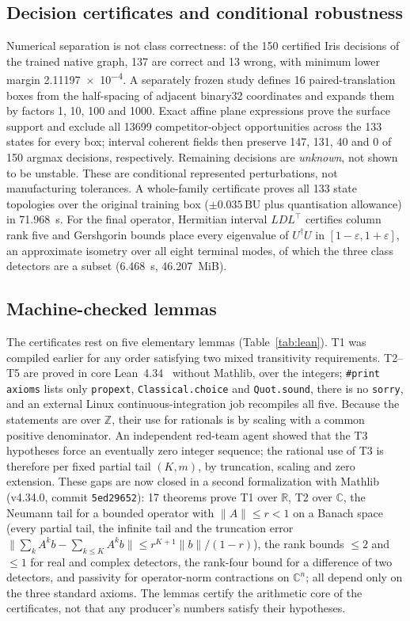 \documentclass[11pt,a4paper]{article}
\newcommand{\BU}{\,\mathrm{BU}}
\begin{document}
\subsection{Decision certificates and conditional robustness}
Numerical separation is not class correctness: of the 150 certified Iris decisions of the trained native graph, 137 are correct and 13 wrong, with minimum lower margin \num{2.11197e-4}. A separately frozen study defines 16 paired-translation boxes from the half-spacing of adjacent binary32 coordinates and expands them by factors 1, 10, 100 and 1000. Exact affine plane expressions prove the surface support and exclude all \num{13699} competitor-object opportunities across the 133 states for every box; interval coherent fields then preserve 147, 131, 40 and 0 of 150 argmax decisions, respectively. Remaining decisions are \emph{unknown}, not shown to be unstable. These are conditional represented perturbations, not manufacturing tolerances. A whole-family certificate proves all 133 state topologies over the original training box ($\pm0.035\BU$ plus quantisation allowance) in \SI{71.968}{s}. For the final operator, Hermitian interval $LDL^{\top}$ certifies column rank five and Gershgorin bounds place every eigenvalue of $U^{\dagger}U$ in $[1-\varepsilon, 1+\varepsilon]$, an approximate isometry over all eight terminal modes, of which the three class detectors are a subset (\SI{6.468}{s}, \SI{46.207}{MiB}).

\subsection{Machine-checked lemmas}
The certificates rest on five elementary lemmas (Table~\ref{tab:lean}). T1 was compiled earlier for any order satisfying two mixed transitivity requirements. T2--T5 are proved in core Lean~4.34~\cite{demoura2021} without Mathlib, over the integers; \texttt{\#print axioms} lists only \texttt{propext}, \texttt{Classical.choice} and \texttt{Quot.sound}, there is no \texttt{sorry}, and an external Linux continuous-integration job recompiles all five. Because the statements are over $\mathbb{Z}$, their use for rationals is by scaling with a common positive denominator. An independent red-team agent showed that the T3 hypotheses force an eventually zero integer sequence; the rational use of T3 is therefore per fixed partial tail $(K, m)$, by truncation, scaling and zero extension. These gaps are now closed in a second formalization with Mathlib (v4.34.0, commit \texttt{5ed29652}): 17 theorems prove T1 over $\mathbb{R}$, T2 over $\mathbb{C}$, the Neumann tail for a bounded operator with $\lVert A\rVert \le r < 1$ on a Banach space (every partial tail, the infinite tail and the truncation error $\lVert \sum_k A^k b - \sum_{k\le K} A^k b\rVert \le r^{K+1}\lVert b\rVert/(1-r)$), the rank bounds $\le 2$ and $\le 1$ for real and complex detectors, the rank-four bound for a difference of two detectors, and passivity for operator-norm contractions on $\mathbb{C}^n$; all depend only on the three standard axioms. The lemmas certify the arithmetic core of the certificates, not that any producer's numbers satisfy their hypotheses.
\end{document}
